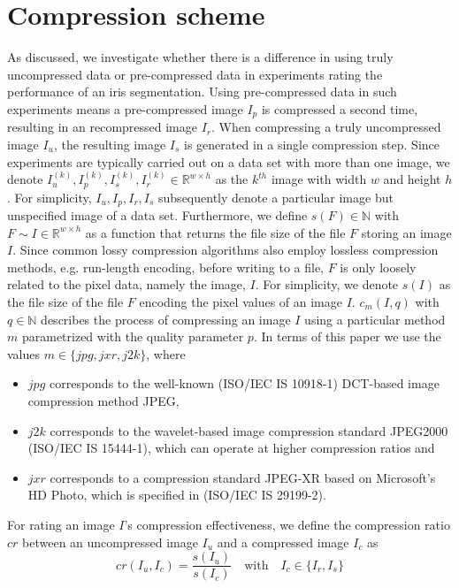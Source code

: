 \documentclass[10pt,twocolumn,letterpaper]{article}
\begin{document}
\section{Compression scheme}
\label{section:comprScheme}
As discussed, we investigate whether there is a difference in using truly uncompressed data or pre-compressed data in experiments rating the performance of an iris segmentation. 
Using pre-compressed data in such experiments means a pre-compressed image $I_p$ is compressed a second time, resulting in an recompressed image $I_r$. When compressing a truly uncompressed image $I_u$, the resulting image $I_s$ is generated in a single compression step. Since experiments are typically carried out on a data set with more than one image, we denote $I_u^{(k)}, I_p^{(k)}, I_s^{(k)}, I_r^{(k)} \in \mathbb{R}^{w \times h}$ as the $k^{th}$ image with width $w$ and height $h$. For simplicity, $I_u, I_p, I_r, I_s$ subsequently denote a particular image but unspecified image of a data set. Furthermore, we define $s(F) \in \mathbb{N}$ with $F \sim{I \in \mathbb{R}^{w \times h}}$ as a function that returns the file size of the file $F$ storing an image $I$. Since common lossy compression algorithms also employ lossless compression methods, e.g. run-length encoding, before writing to a file, $F$ is only loosely related to the pixel data, namely the image, $I$. For simplicity, we denote $s(I)$ as the file size of the file $F$ encoding the pixel values of an image $I$. $c_{m}(I, q)$ with $q \in \mathbb{N}$ describes the process of compressing an image $I$ using a particular method $m$ parametrized with the quality parameter $p$. In terms of this paper we use the values $m \in \{jpg, jxr, j2k\}$, where 
\begin{itemize}
	\item $jpg$ corresponds to the well-known (ISO/IEC IS 10918-1) DCT-based image compression method JPEG, %
	\item $j2k$ corresponds to the wavelet-based image compression standard JPEG2000 (ISO/IEC IS 15444-1), which can operate at higher compression ratios %
	and
	\item $jxr$ corresponds to a compression standard JPEG-XR based on Microsoft’s HD Photo, which is specified in (ISO/IEC IS 29199-2). %
\end{itemize}

For rating an image $I$'s compression effectiveness, we define the compression ratio $cr$ between an uncompressed image $I_u$ and a compressed image $I_c$ as 
\begin{equation}
cr(I_u, I_c) = \frac{s(I_u)}{s(I_c)} \quad \text{with} \quad I_c \in \{I_r, I_s\}
\end{equation}
\end{document}
